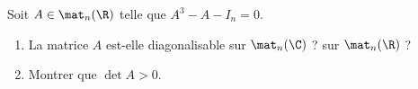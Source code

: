 \begin{enonce}
\begin{exercise}[ID={RMS 122-2 E1199 ENSAM PSI},subtitle={},tags={}]
Soit $A\in\mat_n(\R)$ telle que $A^3-A-I_n=0$.
\begin{enumerate}
  \item La matrice $A$ est-elle diagonalisable sur $\mat_n(\C)$ ? sur $\mat_n(\R)$ ?
  \item Montrer que $\det A>0$.
\end{enumerate}
\end{exercise}
\begin{solution}
\end{solution}
\end{enonce}
